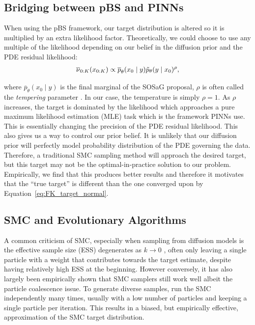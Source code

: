 \subsection{Bridging between pBS and PINNs}
When using the pBS framework, our target distribution is altered so it is multiplied by an extra likelihood factor. Theoretically, we could choose to use any multiple of the likelihood depending on our belief in the diffusion prior and the PDE residual likelihood: 
\begin{align}
    \overline{\nu}_{0:K}(x_{0:K}) \propto \overline{p}_\theta(x_{0} \mid y) \Tilde{p}_{\theta}(y\mid x_0)^\rho,
    \label{app:pbs_tempered_target}
\end{align}

where $\overline{p}_\theta(x_{0} \mid y)$ is the final marginal of the SOSaG proposal, $\rho$ is often called the \emph{tempering} parameter \citep{neal2001annealed, buchholz2021adaptive}. 
In our case, the temperature is simply $\rho = 1$. 
As $\rho$ increases, the target is dominated by the likelihood which approaches a pure maximum likelihood estimation (MLE) task which is the framework PINNs use. 
This is essentially changing the precision of the PDE residual likelihood. 
This also gives us a way to control our prior belief. It is unlikely that our diffusion prior will perfectly model probability distribution of the PDE governing the data. Therefore, a traditional SMC sampling method will approach the desired target, but this target may not be the optimal-in-practice solution to our problem. Empirically, we find that this produces better results and therefore it motivates that the ``true target'' is different than the one converged upon by Equation~\eqref{eq:FK_target_normal}. 

\subsection{SMC and Evolutionary Algorithms} 
\label{sec:smc-ea}

A common criticism of SMC, especially when sampling from diffusion models is the effective sample size (ESS) degenerates as $k\to0$ \citep{wu2023-TDS, corenflos2024conditioning, zhao2025generativediffusionposteriorsampling}, often only leaving a single particle with a weight that contributes towards the target estimate, despite having relatively high ESS at the beginning. 
However conversely, it has also largely been empirically shown that SMC samplers still work well albeit the particle coalescence issue. To generate diverse samples, \citet{dou2024diffusion, Trippe2023diffusion} run the SMC independently many times, usually with a low number of particles and keeping a single particle per iteration. This results in a biased, but empirically effective, approximation of the SMC target distribution.

